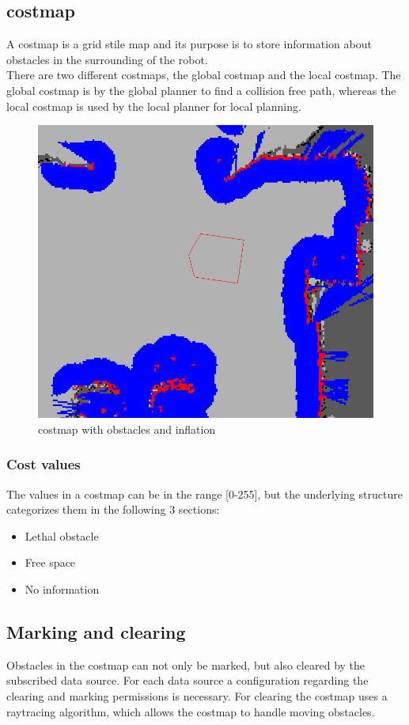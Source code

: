 \subsection{costmap}
A costmap is a grid stile map and its purpose is to store information about obstacles in the surrounding of the robot.\\
There are two different costmaps, the global costmap and the local costmap.
The global costmap is by the global planner to find a collision free path, whereas the local costmap is used by the local planner for local planning.\cite{navsetup}\\

\begin{figure}[H]
\centering
	\includegraphics[width=.5\textwidth]{Pictures/costmap_rviz}
	\caption{costmap with obstacles and inflation \cite{costmap}}
	\label{costmap}
\end{figure}


\subsubsection{Cost values}
The values in a costmap can be in the range [0-255], but the underlying structure categorizes them in the following 3 sections:
\begin{itemize}
	\item Lethal obstacle
	\item Free space
	\item No information
\end{itemize}

\subsection{Marking and clearing}
Obstacles in the costmap can not only be marked, but also cleared by the subscribed data source. For each data source a configuration regarding the clearing and marking permissions is necessary. For clearing the costmap uses a raytracing algorithm, which allows the costmap to handle moving obstacles\cite{costmap}.
